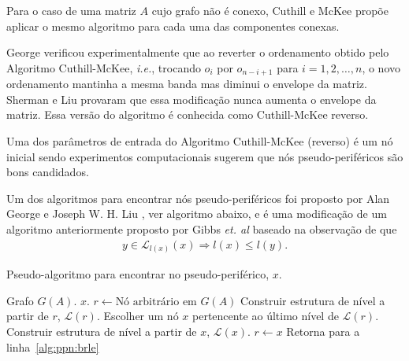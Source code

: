 Para o caso de uma matriz $A$ cujo grafo não é conexo, Cuthill e McKee propõe
aplicar o mesmo algoritmo para cada uma das componentes conexas.

George \cite{George:1971:ComputerImplementation} verificou
experimentalmente que ao reverter o ordenamento obtido pelo Algoritmo
Cuthill-McKee, \textit{i.e.}, trocando $o_i$ por $o_{n - i + 1}$ para $i = 1, 2,
\ldots, n$, o novo ordenamento mantinha a mesma banda mas diminui o
envelope da matriz. Sherman e Liu \cite{Liu:1976:ComparativeCuthillMcKee} provaram que essa modificação nunca
aumenta o envelope da matriz. Essa versão do algoritmo é conhecida como Cuthill-McKee
reverso.

Uma dos parâmetros de entrada do Algoritmo Cuthill-McKee (reverso) é um nó inicial sendo
experimentos computacionais \cite{Cuthill:1969:ReducingBandwidth} sugerem que
nós pseudo-periféricos são bons candidados.

Um dos algoritmos para encontrar nós pseudo-periféricos foi proposto por Alan
George e Joseph W. H. Liu \cite{George:1979:NodeFinder}, ver algoritmo
abaixo, e é uma
modificação de um algoritmo anteriormente proposto por Gibbs \textit{et. al}
\cite{Gibbs:1976:ReducingBandwidth} baseado na observação de que
\begin{align*}
    y \in \mathcal{L}_{l(x)}(x) \Longrightarrow l(x) \leq l(y).
\end{align*}
\begin{algorithm}[H]
    \caption{Pseudo-algoritmo para encontrar no pseudo-periférico, $x$.}
    \label{alg:ppn}
    \begin{algorithmic}[1]
        \REQUIRE Grafo $G(A)$.
        \ENSURE $x$.
        \STATE $r \longleftarrow \text{Nó arbitrário em }G(A)$
        \STATE Construir estrutura de nível a partir de $r$, $\mathcal{L}(r)$.
        \label{alg:ppn:brle}
        \STATE Escolher um nó $x$ pertencente ao último nível de
        $\mathcal{L}(r)$.
        \STATE Construir estrutura de nível a partir de $x$, $\mathcal{L}(x)$.
            \STATE $r \longleftarrow x$
            \STATE Retorna para a linha~\ref{alg:ppn:brle}
        \ENDIF
    \end{algorithmic}
\end{algorithm}
